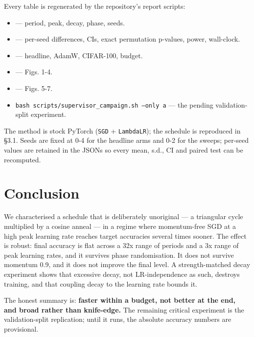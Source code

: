 \documentclass[11pt,a4paper]{article}
\begin{document}
Every table is regenerated by the repository's report scripts:

\begin{itemize}
\item {} --- period, peak, decay, phase, seeds.
\item {} --- per-seed differences, CIs, exact permutation p-values, power, wall-clock.
\item {} --- headline, AdamW, CIFAR-100, budget.
\end{itemize}

\begin{itemize}
\item {} --- Figs. 1-4.
\item {} --- Figs. 5-7.
\item \texttt{bash scripts/supervisor\_campaign.sh --only a} --- the pending validation-split experiment.
\end{itemize}

The method is stock PyTorch (\texttt{SGD} + \texttt{LambdaLR}); the schedule is reproduced in \S{}3.1. Seeds are fixed at 0-4 for the headline arms and 0-2 for the sweeps; per-seed values are retained in the JSONs so every mean, s.d., CI and paired test can be recomputed.

\section{Conclusion}
We characterised a schedule that is deliberately unoriginal --- a triangular cycle multiplied by a cosine anneal --- in a regime where momentum-free SGD at a high peak learning rate reaches target accuracies several times sooner. The effect is robust: final accuracy is flat across a 32x range of periods and a 3x range of peak learning rates, and it survives phase randomisation. It does not survive momentum 0.9, and it does not improve the final level. A strength-matched decay experiment shows that excessive decay, not LR-independence as such, destroys training, and that coupling decay to the learning rate bounds it.

The honest summary is: \textbf{faster within a budget, not better at the end, and broad rather than knife-edge.} The remaining critical experiment is the validation-split replication; until it runs, the absolute accuracy numbers are provisional.
\end{document}
